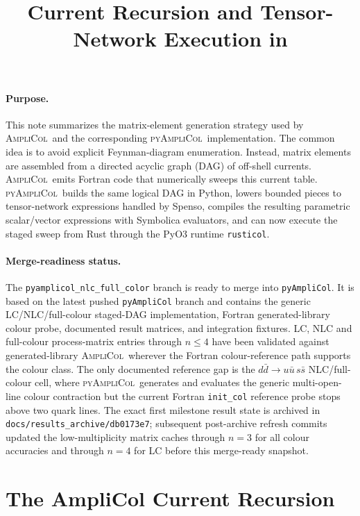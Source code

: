 \documentclass[10pt]{article}
\title{\vspace{-2.0em}Current Recursion and Tensor-Network Execution in \PAC}
\author{}
\date{\vspace{-3.0em}}
\newcommand{\AC}{\textsc{AmpliCol}}
\newcommand{\PAC}{\textsc{pyAmpliCol}}
\begin{document}
\maketitle
\vspace{-1.2em}

\paragraph{Purpose.}
This note summarizes the matrix-element generation strategy used by \AC\ and
the corresponding \PAC\ implementation.  The common idea is to avoid explicit
Feynman-diagram enumeration.  Instead, matrix elements are assembled from a
directed acyclic graph (DAG) of off-shell currents.  \AC\ emits Fortran code
that numerically sweeps this current table.  \PAC\ builds the same logical DAG
in Python, lowers bounded pieces to tensor-network expressions handled by
Spenso, compiles the resulting parametric scalar/vector expressions with
Symbolica evaluators, and can now execute the staged sweep from Rust through
the PyO3 runtime \texttt{rusticol}.

\paragraph{Merge-readiness status.}
The \texttt{pyamplicol\_nlc\_full\_color} branch is ready to merge into
\texttt{pyAmpliCol}.  It is based on the latest pushed \texttt{pyAmpliCol}
branch and contains the generic LC/NLC/full-colour staged-DAG implementation,
Fortran generated-library colour probe, documented result matrices, and
integration fixtures.  LC, NLC and full-colour process-matrix entries through
\(n\le4\) have been validated against generated-library \AC\ wherever the
Fortran colour-reference path supports the colour class.  The only documented
reference gap is the \(d\bar d\to u\bar u\,s\bar s\) NLC/full-colour cell,
where \PAC\ generates and evaluates the generic multi-open-line colour
contraction but the current Fortran \texttt{init\_col} reference probe stops
above two quark lines.  The exact first milestone result state is archived in
\texttt{docs/results\_archive/db0173e7}; subsequent post-archive refresh
commits updated the low-multiplicity matrix caches through \(n=3\) for all
colour accuracies and through \(n=4\) for LC before this merge-ready snapshot.

\section{The AmpliCol Current Recursion}
\end{document}
